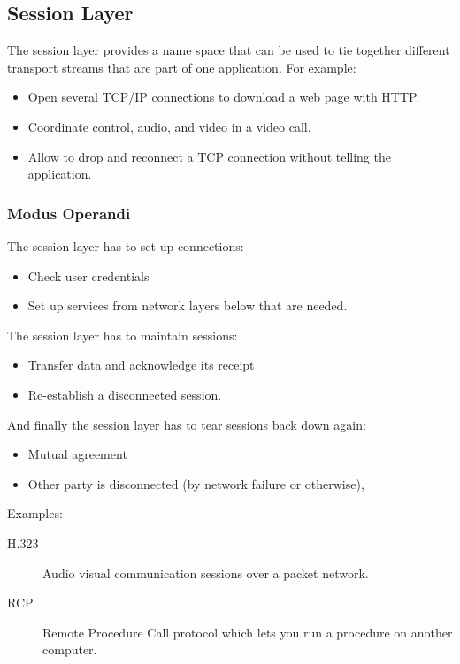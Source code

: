 \subsection{Session Layer}\label{sub:session_layer}

The session layer provides a name space that can be used to tie together different transport streams that are part of one application.
For example:
\begin{itemize}
    \item Open several TCP/IP connections to download a web page with HTTP.
    \item Coordinate control, audio, and video in a video call.
    \item Allow to drop and reconnect a TCP connection without telling the application.
\end{itemize}

\subsubsection{Modus Operandi}\label{ssub:modus_operandi}

The session layer has to set-up connections:
\begin{itemize}
    \item Check user credentials
    \item Set up services from network layers below that are needed.
\end{itemize}
The session layer has to maintain sessions:
\begin{itemize}
    \item Transfer data and acknowledge its receipt
    \item Re-establish a disconnected session.
\end{itemize}
And finally the session layer has to tear sessions back down again:
\begin{itemize}
    \item Mutual agreement
    \item Other party is disconnected (by network failure or otherwise),
\end{itemize}
Examples:
\begin{description}
    \item[H.323] Audio visual communication sessions over a packet network.
    \item[RCP] Remote Procedure Call protocol which lets you run a procedure on another computer.
\end{description}

